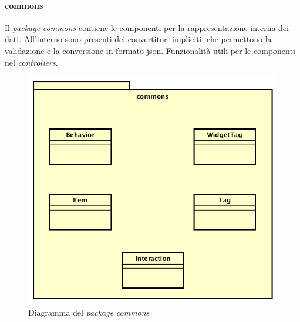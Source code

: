 \paragraph*{commons}
Il \emph{package} \emph{commons} contiene le componenti per la rappresentazione interna dei dati. All'interno sono presenti dei convertitori impliciti, che permettono la validazione e la conversione in formato \gls{json}. Funzionalità utili per le componenti nel \emph{controllers}. 
\begin{figure}[h]
\centering
\includegraphics[scale=0.28]{immagini/commons}
\caption{Diagramma del \emph{package} \emph{commons}}
\label{fig:pack-commons}
\end{figure}
